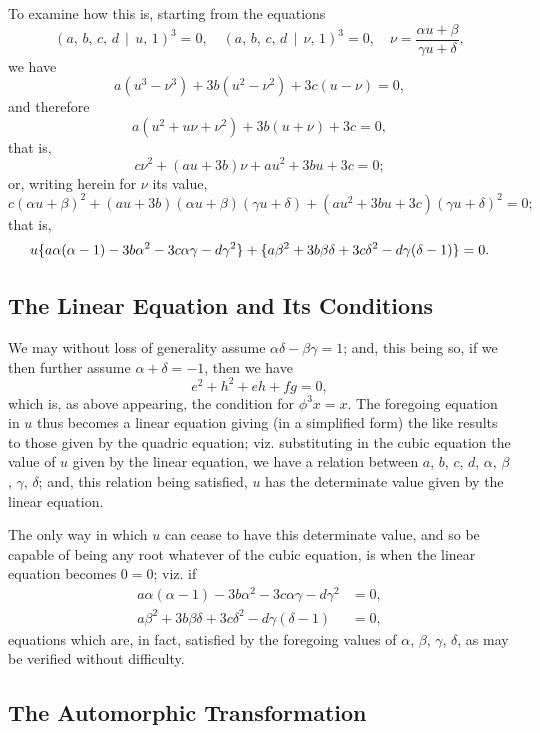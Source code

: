 \documentclass[11pt,a4paper]{book}
\begin{document}
To examine how this is, starting from the equations
\[
(a,\, b,\, c,\, d \,\!\!\mid\!\!\, u,\, 1)^{3} = 0,\quad (a,\, b,\, c,\, d \,\!\!\mid\!\!\, \nu,\, 1)^{3} = 0,\quad \nu = \frac{\alpha u + \beta}{\gamma u + \delta},
\]
we have
\[
a(u^{3} - \nu^{3}) + 3b(u^{2} - \nu^{2}) + 3c(u - \nu) = 0,
\]
and therefore
\[
a(u^{2} + u\nu + \nu^{2}) + 3b(u + \nu) + 3c = 0,
\]
that is,
\[
c\nu^{2} + (au + 3b)\nu + au^{2} + 3bu + 3c = 0;
\]
or, writing herein for $\nu$ its value,
\[
c(\alpha u + \beta)^{2} + (au + 3b)(\alpha u + \beta)(\gamma u + \delta) + (au^{2} + 3bu + 3c)(\gamma u + \delta)^{2} = 0;
\]
that is,
\[
u \{a\alpha(\alpha - 1) - 3b\alpha^{2} - 3c\alpha\gamma - d\gamma^{2}\} \\
+ \{a\beta^{2} + 3b\beta\delta + 3c\delta^{2} - d\gamma(\delta - 1)\} = 0.
\]

\subsection*{The Linear Equation and Its Conditions}

We may without loss of generality assume $\alpha\delta - \beta\gamma = 1$; and, this being so, if we then further assume $\alpha + \delta = -1$, then we have
\[
e^{2} + h^{2} + eh + fg = 0,
\]
which is, as above appearing, the condition for $\phi^{3}x = x$. The foregoing equation in $u$ thus becomes a linear equation giving (in a simplified form) the like results to those given by the quadric equation; viz. substituting in the cubic equation the value of $u$ given by the linear equation, we have a relation between $a$, $b$, $c$, $d$, $\alpha$, $\beta$, $\gamma$, $\delta$; and, this relation being satisfied, $u$ has the determinate value given by the linear equation.

The only way in which $u$ can cease to have this determinate value, and so be capable of being any root whatever of the cubic equation, is when the linear equation becomes $0 = 0$; viz. if
\begin{align*}
a\alpha(\alpha - 1) - 3b\alpha^{2} - 3c\alpha\gamma - d\gamma^{2} &= 0,\\
a\beta^{2} + 3b\beta\delta + 3c\delta^{2} - d\gamma(\delta - 1) &= 0,
\end{align*}
equations which are, in fact, satisfied by the foregoing values of $\alpha$, $\beta$, $\gamma$, $\delta$, as may be verified without difficulty.

\subsection*{The Automorphic Transformation}
\end{document}
